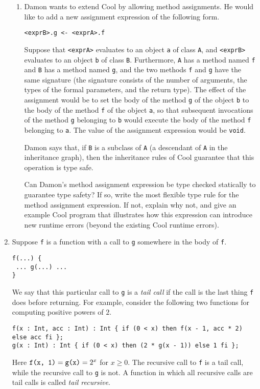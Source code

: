 \documentclass[11pt]{article}
\begin{document}
\begin{enumerate}
\begin{enumerate}
\item Damon wants to extend Cool by allowing method assignments.  He
would like to add a new assignment expression of the following form.
\begin{verbatim}
<exprB>.g <- <exprA>.f
\end{verbatim}
\noindent
Suppose that \texttt{<exprA>} evaluates to an object \texttt{a} of
class \texttt{A}, and \texttt{<exprB>} evaluates to an object
\texttt{b} of class \texttt{B}.  Furthermore, \texttt{A} has a method
named \texttt{f} and \texttt{B} has a method named \texttt{g}, and
the two methods \texttt{f} and \texttt{g} have the same signature (the
signature consists of the number of arguments, the types of the formal
parameters, and the return type).  The effect of the assignment would
be to set the body of the method \texttt{g} of the object \texttt{b}
to the body of the method \texttt{f} of the object \texttt{a}, so that
subsequent invocations of the method \texttt{g} belonging to
\texttt{b} would execute the body of the method \texttt{f} belonging
to \texttt{a}.  The value of the assignment expression would be
\texttt{void}.

Damon says that, if \texttt{B} is a subclass of \texttt{A} (a
descendant of \texttt{A} in the inheritance graph), then the
inheritance rules of Cool guarantee that this operation is type safe.

Can Damon's method assignment expression be type checked statically to
guarantee type safety?  If so, write the most flexible type rule for
the method assignment expression.  If not, explain why not, and give
an example Cool program that illustrates how this expression can
introduce new runtime errors (beyond the existing Cool runtime
errors).
\end{enumerate}

\item Suppose \texttt{f} is a function with a call to \texttt{g}
somewhere in the body of \texttt{f}.
\begin{verbatim}
f(...) {
 ... g(...) ...
}
\end{verbatim}
We say that this particular call to \texttt{g} is a {\it tail call}
if the call is the last thing \texttt{f} does before returning.  For
example, consider the following two functions for computing positive
powers of $2$.
\begin{verbatim}
f(x : Int, acc : Int) : Int { if (0 < x) then f(x - 1, acc * 2) else acc fi };
g(x : Int) : Int { if (0 < x) then (2 * g(x - 1)) else 1 fi };
\end{verbatim}
Here $\verb'f(x, 1)' = \verb'g(x)' = 2^x$ for $x\geq 0$.  The
recursive call to \texttt{f} is a tail call, while the recursive call
to \texttt{g} is not.  A function in which all recursive calls are
tail calls is called {\it tail recursive}.


\end{enumerate}
\end{document}
